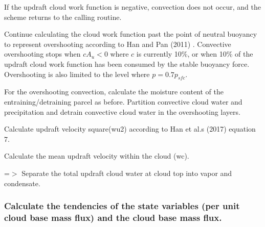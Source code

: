 \begin{DoxyItemize}
\item If the updraft cloud work function is negative, convection does not occur, and the scheme returns to the calling routine.
\item Continue calculating the cloud work function past the point of neutral buoyancy to represent overshooting according to Han and Pan (2011) \cite{han_and_pan_2011} . Convective overshooting stops when $ cA_u < 0$ where $c$ is currently 10\%, or when 10\% of the updraft cloud work function has been consumed by the stable buoyancy force. Overshooting is also limited to the level where $p=0.7p_{sfc}$.
\item For the overshooting convection, calculate the moisture content of the entraining/detraining parcel as before. Partition convective cloud water and precipitation and detrain convective cloud water in the overshooting layers.
\item Calculate updraft velocity square(wu2) according to Han et al.\textquotesingle{}s (2017) \cite{han_et_al_2017} equation 7.
\item Calculate the mean updraft velocity within the cloud (wc).
\item =$>$ Separate the total updraft cloud water at cloud top into vapor and condensate.
\end{DoxyItemize}

\subsubsection*{Calculate the tendencies of the state variables (per unit cloud base mass flux) and the cloud base mass flux.}


